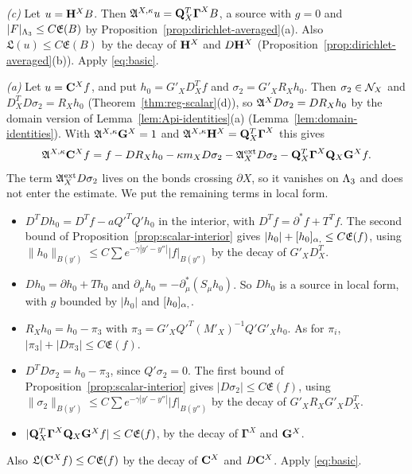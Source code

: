 \emph{(c)} Let $u=\mathbf H^XB$. Then $\mathfrak A^{X,\kappa}u=\mathbf Q_X^T\boldsymbol\Gamma^XB$, a source with $g=0$ and $|F|_{\Lambda_3}\le C\mathfrak E(B)$ by Proposition~\ref{prop:dirichlet-averaged}(a). Also $\mathfrak L(u)\le C\mathfrak E(B)$ by the decay of $\mathbf H^X$ and $D\mathbf H^X$ (Proposition~\ref{prop:dirichlet-averaged}(b)). Apply \eqref{eq:basic}.

\emph{(a)} Let $u=\mathbf C^Xf$, and put $h_0=G'_XD^T_Xf$ and $\sigma_2=G'_XR_Xh_0$. Then $\sigma_2\in\mathcal N_X$ and $D^T_XD\sigma_2=R_Xh_0$ (Theorem~\ref{thm:reg-scalar}(d)), so $\mathfrak A^XD\sigma_2=DR_Xh_0$ by the domain version of Lemma~\ref{lem:Api-identities}(a) (Lemma~\ref{lem:domain-identities}). With $\mathfrak A^{X,\kappa}\mathbf G^X=1$ and $\mathfrak A^{X,\kappa}\mathbf H^X=\mathbf Q_X^T\boldsymbol\Gamma^X$ this gives
\[
\mathfrak A^{X,\kappa}\mathbf C^Xf=f-DR_Xh_0-\kappa m_XD\sigma_2-\mathfrak A^{\rm ext}_XD\sigma_2-\mathbf Q_X^T\boldsymbol\Gamma^X\mathbf Q_X\mathbf G^Xf .
\]
The term $\mathfrak A^{\rm ext}_XD\sigma_2$ lives on the bonds crossing $\partial X$, so it vanishes on $\Lambda_3$ and does not enter the estimate. We put the remaining terms in local form.
\begin{itemize}
\item $D^TDh_0=D^Tf-aQ'^TQ'h_0$ in the interior, with $D^Tf=\partial^*f+T^Tf$. The second bound of Proposition~\ref{prop:scalar-interior} gives $|h_0|+[h_0]_{\alpha,}\le C\mathfrak E(f)$, using $\|h_0\|_{B(y')}\le C\sum e^{-\gamma|y'-y''|}|f|_{B(y'')}$ by the decay of $G'_XD^T_X$.
\item $Dh_0=\partial h_0+Th_0$ and $\partial_\mu h_0=-\partial^*_\mu(S_\mu h_0)$. So $Dh_0$ is a source in local form, with $g$ bounded by $|h_0|$ and $[h_0]_{\alpha,}$.
\item $R_Xh_0=h_0-\pi_3$ with $\pi_3=G'_XQ'^T(M'_X)^{-1}Q'G'_Xh_0$. As for $\pi_i$, $|\pi_3|+|D\pi_3|\le C\mathfrak E(f)$.
\item $D^TD\sigma_2=h_0-\pi_3$, since $Q'\sigma_2=0$. The first bound of Proposition~\ref{prop:scalar-interior} gives $|D\sigma_2|\le C\mathfrak E(f)$, using $\|\sigma_2\|_{B(y')}\le C\sum e^{-\gamma|y'-y''|}|f|_{B(y'')}$ by the decay of $G'_XR_XG'_XD^T_X$.
\item $|\mathbf Q_X^T\boldsymbol\Gamma^X\mathbf Q_X\mathbf G^Xf|\le C\mathfrak E(f)$, by the decay of $\boldsymbol\Gamma^X$ and $\mathbf G^X$.
\end{itemize}
Also $\mathfrak L(\mathbf C^Xf)\le C\mathfrak E(f)$ by the decay of $\mathbf C^X$ and $D\mathbf C^X$. Apply \eqref{eq:basic}.

